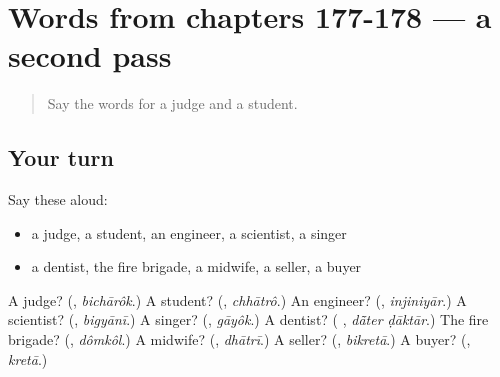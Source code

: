 \section[(dialogue)]{Words from chapters 177-178 — a second pass}

\label{lesson:BN-R178-second-pass-words-from-chapters-177-178}



\begin{quote}
Say the words for a judge and a student.
\end{quote}

\subsection*{Your turn}
Say these aloud:

\begin{itemize}
\raggedright
  \item a judge, a student, an engineer, a scientist, a singer
  \item a dentist, the fire brigade, a midwife, a seller, a buyer
\end{itemize}

\begin{tcolorbox}[breakable,colback=teal!4,colframe=teal!35!black,title={Before you move on}]
A judge? (\textbf{}, \emph{bichārôk}.) A student? (\textbf{}, \emph{chhātrô}.) An engineer? (\textbf{}, \emph{injiniyār}.) A scientist? (\textbf{}, \emph{bigyānī}.) A singer? (\textbf{}, \emph{gāyôk}.) A dentist? (\textbf{ }, \emph{dā̃ter ḍāktār}.) The fire brigade? (\textbf{}, \emph{dômkôl}.) A midwife? (\textbf{}, \emph{dhātrī}.) A seller? (\textbf{}, \emph{bikretā}.) A buyer? (\textbf{}, \emph{kretā}.)
\end{tcolorbox}
